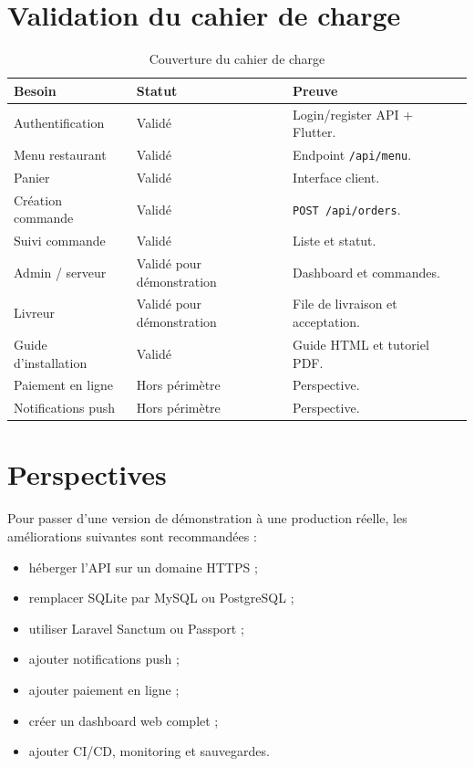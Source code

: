 \documentclass[12pt,a4paper]{report}
\begin{document}
\section{Validation du cahier de charge}
\begin{longtable}{p{6cm}p{4cm}p{4cm}}
\caption{Couverture du cahier de charge}\\
\toprule
\textbf{Besoin} & \textbf{Statut} & \textbf{Preuve}\\
\midrule
Authentification & Validé & Login/register API + Flutter.\\
Menu restaurant & Validé & Endpoint \texttt{/api/menu}.\\
Panier & Validé & Interface client.\\
Création commande & Validé & \texttt{POST /api/orders}.\\
Suivi commande & Validé & Liste et statut.\\
Admin / serveur & Validé pour démonstration & Dashboard et commandes.\\
Livreur & Validé pour démonstration & File de livraison et acceptation.\\
Guide d'installation & Validé & Guide HTML et tutoriel PDF.\\
Paiement en ligne & Hors périmètre & Perspective.\\
Notifications push & Hors périmètre & Perspective.\\
\bottomrule
\end{longtable}

\section{Perspectives}
Pour passer d'une version de démonstration à une production réelle, les améliorations suivantes sont recommandées :
\begin{itemize}
  \item héberger l'API sur un domaine HTTPS ;
  \item remplacer SQLite par MySQL ou PostgreSQL ;
  \item utiliser Laravel Sanctum ou Passport ;
  \item ajouter notifications push ;
  \item ajouter paiement en ligne ;
  \item créer un dashboard web complet ;
  \item ajouter CI/CD, monitoring et sauvegardes.
\end{itemize}

\appendix
\end{document}
